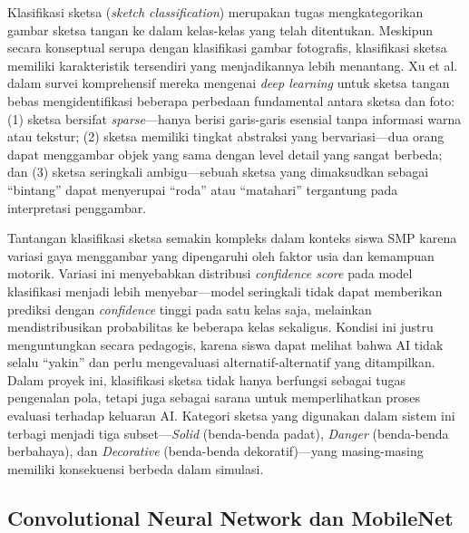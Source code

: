 \documentclass[12pt,a4paper,oneside,openany]{report}
\begin{document}
Klasifikasi sketsa (\textit{sketch classification}) merupakan tugas mengkategorikan gambar sketsa tangan ke dalam kelas-kelas yang telah ditentukan. Meskipun secara konseptual serupa dengan klasifikasi gambar fotografis, klasifikasi sketsa memiliki karakteristik tersendiri yang menjadikannya lebih menantang. Xu et al. \cite{ref6} dalam survei komprehensif mereka mengenai \textit{deep learning} untuk sketsa tangan bebas mengidentifikasi beberapa perbedaan fundamental antara sketsa dan foto: (1) sketsa bersifat \textit{sparse}---hanya berisi garis-garis esensial tanpa informasi warna atau tekstur; (2) sketsa memiliki tingkat abstraksi yang bervariasi---dua orang dapat menggambar objek yang sama dengan level detail yang sangat berbeda; dan (3) sketsa seringkali ambigu---sebuah sketsa yang dimaksudkan sebagai ``bintang'' dapat menyerupai ``roda'' atau ``matahari'' tergantung pada interpretasi penggambar.

Tantangan klasifikasi sketsa semakin kompleks dalam konteks siswa SMP karena variasi gaya menggambar yang dipengaruhi oleh faktor usia dan kemampuan motorik. Variasi ini menyebabkan distribusi \textit{confidence score} pada model klasifikasi menjadi lebih menyebar---model seringkali tidak dapat memberikan prediksi dengan \textit{confidence} tinggi pada satu kelas saja, melainkan mendistribusikan probabilitas ke beberapa kelas sekaligus. Kondisi ini justru menguntungkan secara pedagogis, karena siswa dapat melihat bahwa AI tidak selalu ``yakin'' dan perlu mengevaluasi alternatif-alternatif yang ditampilkan. Dalam proyek ini, klasifikasi sketsa tidak hanya berfungsi sebagai tugas pengenalan pola, tetapi juga sebagai sarana untuk memperlihatkan proses evaluasi terhadap keluaran AI. Kategori sketsa yang digunakan dalam sistem ini terbagi menjadi tiga subset---\textit{Solid} (benda-benda padat), \textit{Danger} (benda-benda berbahaya), dan \textit{Decorative} (benda-benda dekoratif)---yang masing-masing memiliki konsekuensi berbeda dalam simulasi.

\subsection{Convolutional Neural Network dan MobileNet}
\label{subsec:cnn-mobilenet}
\end{document}
